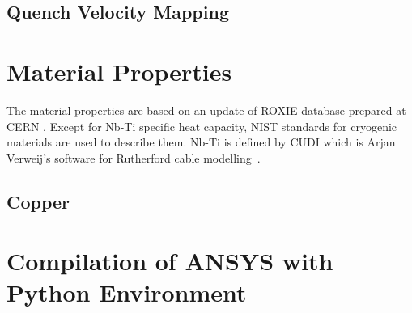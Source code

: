 \documentclass{article}
\begin{document}
\subsection{Quench Velocity Mapping}


\clearpage
\begin{appendices}

\section{Material Properties}
\label{appendix_material_properties_description}

The material properties are based on an update of ROXIE database prepared at CERN \cite{material_properties_roxie}. Except for Nb-Ti specific heat capacity, NIST standards for cryogenic materials are used to describe them. Nb-Ti is defined by CUDI which is Arjan Verweij's software for Rutherford cable modelling~\cite{cudi_manual}.  

\subsection{Copper}
\label{appendix:cu_material_properties}


% 

% 

\section{Compilation of ANSYS with Python Environment}
\label{appendix:python_ansys_compilation}



\end{appendices}

\clearpage


\end{document}
